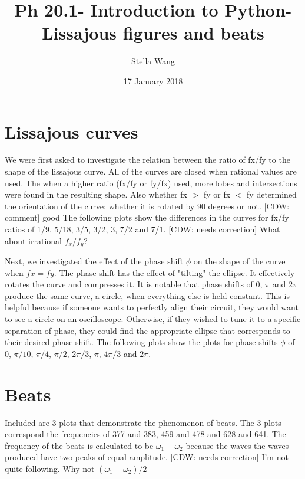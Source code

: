 \documentclass{article}
\title{Ph 20.1- Introduction to Python- Lissajous figures and beats
\\ \correct{}}
\author{Stella Wang}
\date{17 January 2018}
\newcommand{\cdw}[1]
           {{\color{blue} [CDW: comment] #1}}
\newcommand{\correct}[1]
           {{\color{red} [CDW: needs correction] #1}}
\begin{document}
	\maketitle
\section{Lissajous curves}
We were first asked to investigate the relation between the ratio of fx/fy to the shape of the lissajous curve. All of the curves are closed when rational values are used. The when a higher ratio (fx/fy or fy/fx) used, more lobes and intersections were found in the resulting shape. Also whether fx $>$ fy or fx $<$ fy determined the orientation of the curve; whether it is rotated by 90 degrees or not. \cdw{good} The following plots show the differences in the curves for fx/fy ratios of 1/9, 5/18, 3/5, 3/2, 3, 7/2 and 7/1.
\correct{What about irrational $f_x/f_y$?}


Next, we investigated the effect of the phase shift $\phi$ on the shape of the curve when $fx=fy$. The phase shift has the effect of "tilting" the ellipse. It effectively rotates the curve and compresses it. It is notable that phase shifts of 0, $\pi$ and $2\pi$ produce the same curve, a circle, when everything else is held constant. This is helpful because if someone wants to perfectly align their circuit, they would want to see a circle on an oscilloscope. Otherwise, if they wished to tune it to a specific separation of phase, they could find the appropriate ellipse that corresponds to their desired phase shift. The following plots show the plots for phase shifts $\phi$ of 0, $\pi/10$, $\pi/4$, $\pi/2$, $2\pi/3$, $\pi$, $4\pi/3$ and $2\pi$.

 
 \section{Beats}
 Included are 3 plots that demonstrate the phenomenon of beats. The 3 plots correspond the frequencies of 377 and 383, 459 and 478 and 628 and 641. The frequency of the beats is calculated to be $\omega_1 - \omega_2$ because the waves the waves produced have two peaks of equal amplitude.\correct{I'm not quite following. Why not $(\omega_1 - \omega_2)/2$}
 
 
\end{document}
